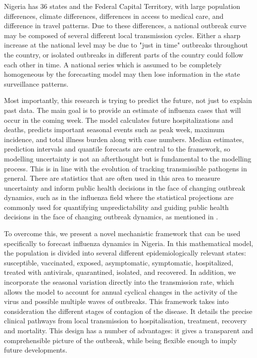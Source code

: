 \documentclass[12pt,a4paper]{article}
\theoremstyle{definition}
\theoremstyle{remark}
\begin{document}
Nigeria has 36 states and the Federal Capital Territory, with large population differences, climate differences, differences in access to medical care, and difference in travel patterns. Due to these differences, a national outbreak curve may be composed of several different local transmission cycles. Either a sharp increase at the national level may be due to "just in time" outbreaks throughout the country, or isolated outbreaks in different parts of the country could follow each other in time. A national series which is assumed to be completely homogeneous by the forecasting model may then lose information in the state surveillance patterns.


Most importantly, this research is trying to predict the future, not just to explain past data. The main goal is to provide an estimate of influenza cases that will occur in the coming week. The model calculates future hospitalizations and deaths, predicts important seasonal events such as peak week, maximum incidence, and total illness burden along with case numbers. Median estimates, prediction intervals and quantile forecasts are central to the framework, so modelling uncertainty is not an afterthought but is fundamental to the modelling process. This is in line with the evolution of tracking transmissible pathogens in general. There are statistics that are often used in this area to measure uncertainty and inform public health decisions in the face of changing outbreak dynamics, such as in the influenza field where the statistical projections are commonly used for quantifying unpredictability and guiding public health decisions in the face of changing outbreak dynamics, as mentioned in \cite{Mathis2024FluSight,Tsang2024adaptive,Ray2025Flusion}.

To overcome this, we present a novel mechanistic framework that can be used specifically to forecast influenza dynamics in Nigeria. In this mathematical model, the population is divided into several different epidemiologically relevant states: susceptible, vaccinated, exposed, asymptomatic, symptomatic, hospitalized, treated with antivirals, quarantined, isolated, and recovered. In addition, we incorporate the seasonal variation directly into the transmission rate, which allows the model to account for annual cyclical changes in the activity of the virus and possible multiple waves of outbreaks. This framework takes into consideration the different stages of contagion of the disease. It details the precise clinical pathways from local transmission to hospitalisation, treatment, recovery and mortality. This design has a number of advantages: it gives a transparent and comprehensible picture of the outbreak, while being flexible enough to imply future developments.
\end{document}
